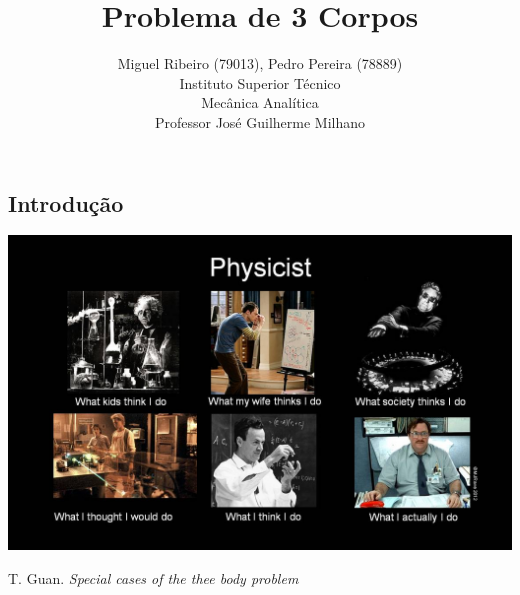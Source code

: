 \documentclass[10pt,a4paper]{article}
\title{\vspace{-10mm}\fontsize{24pt}{10pt}\selectfont\textbf{Problema de 3 Corpos}\vspace{-5pt}} %
\author{\normalsize{Miguel Ribeiro (79013), Pedro Pereira (78889)}\\ %
\normalsize Instituto Superior Técnico\\
\normalsize Mecânica Analítica \\
\normalsize Professor José Guilherme Milhano
\vspace{-5mm}
}
\date{}
\begin{document}
\maketitle %


\begin{multicols}{2} %

\section{Introdução}

\medskip
\begingroup
  \centering
  \includegraphics[width=0.95\columnwidth]{placeholder.jpg}
\endgroup
\medskip



\begin{thebibliography}{99} %

 T. Guan. {\em Special cases of the thee body problem}
\end{thebibliography}
\end{multicols}
\end{document}
